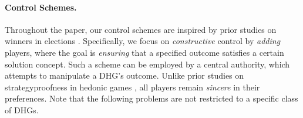\documentclass[letterpaper]{article} %
\newtheorem{remark}{Remark}
\newtheorem{observation}{Observation}
\begin{document}



\paragraph{Control Schemes.} Throughout the paper, our control schemes are inspired by prior studies on winners in elections \cite{bartholdi1992hard,hemaspaandra2007anyone,wojtas2012possible}. Specifically, we focus on \textit{constructive} control by \textit{adding} players, where the goal is \textit{ensuring} that a specified outcome satisfies a certain solution concept. Such a scheme can be employed by a central authority, which attempts to manipulate a DHG's outcome. Unlike prior studies on strategyproofness in hedonic games \cite{flammini2021strategyproof}, all players remain \textit{sincere} in their preferences. Note that the following problems are not restricted to a specific class of DHGs.
\end{document}
